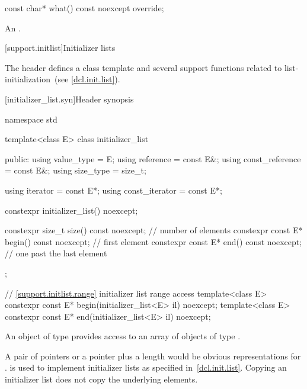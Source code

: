 \begin{itemdecl}
const char* what() const noexcept override;
\end{itemdecl}

\begin{itemdescr}
\pnum
\returns
An  \ntbs.
\end{itemdescr}

[support.initlist]{Initializer lists}

%
%
\pnum
The header  defines a class template and several
support functions related to list-initialization~(see \ref{dcl.init.list}).

[initializer_list.syn]{Header  synopsis}
%
%
%

\begin{codeblock}
namespace std {
  template<class E> class initializer_list {
  public:
    using value_type      = E;
    using reference       = const E&;
    using const_reference = const E&;
    using size_type       = size_t;

    using iterator        = const E*;
    using const_iterator  = const E*;

    constexpr initializer_list() noexcept;

    constexpr size_t size() const noexcept;      // number of elements
    constexpr const E* begin() const noexcept;   // first element
    constexpr const E* end() const noexcept;     // one past the last element
  };

  // \ref{support.initlist.range} initializer list range access
  template<class E> constexpr const E* begin(initializer_list<E> il) noexcept;
  template<class E> constexpr const E* end(initializer_list<E> il) noexcept;
}
\end{codeblock}

\pnum
An object of type  provides access to an array of
objects of type . \begin{note} A pair of pointers or a pointer plus
a length would be obvious representations for .
 is used to implement initializer lists as specified
in~\ref{dcl.init.list}. Copying an initializer list does not copy the underlying
elements. \end{note}


